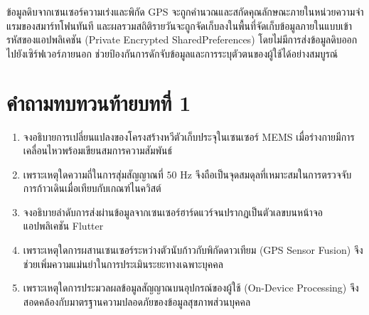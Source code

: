 ข้อมูลดิบจากเซนเซอร์ความเร่งและพิกัด GPS จะถูกคำนวณและสกัดคุณลักษณะภายในหน่วยความจำแรมของสมาร์ทโฟนทันที และผลรวมสถิติรายวันจะถูกจัดเก็บลงในพื้นที่จัดเก็บข้อมูลภายในแบบเข้ารหัสของแอปพลิเคชัน (Private Encrypted SharedPreferences) โดยไม่มีการส่งข้อมูลดิบออกไปยังเซิร์ฟเวอร์ภายนอก ช่วยป้องกันการดักจับข้อมูลและการระบุตัวตนของผู้ใช้ได้อย่างสมบูรณ์

\section*{คำถามทบทวนท้ายบทที่ 1}
\begin{enumerate}
    \item จงอธิบายการเปลี่ยนแปลงของโครงสร้างหวีตัวเก็บประจุในเซนเซอร์ MEMS เมื่อร่างกายมีการเคลื่อนไหวพร้อมเขียนสมการความสัมพันธ์
    \item เพราะเหตุใดความถี่ในการสุ่มสัญญาณที่ $50\text{ Hz}$ จึงถือเป็นจุดสมดุลที่เหมาะสมในการตรวจจับการก้าวเดินเมื่อเทียบกับเกณฑ์ไนควิสต์
    \item จงอธิบายลำดับการส่งผ่านข้อมูลจากเซนเซอร์ฮาร์ดแวร์จนปรากฏเป็นตัวเลขบนหน้าจอแอปพลิเคชัน Flutter
    \item เพราะเหตุใดการผสานเซนเซอร์ระหว่างตัวนับก้าวกับพิกัดดาวเทียม (GPS Sensor Fusion) จึงช่วยเพิ่มความแม่นยำในการประเมินระยะทางเฉพาะบุคคล
    \item เพราะเหตุใดการประมวลผลข้อมูลสัญญาณบนอุปกรณ์ของผู้ใช้ (On-Device Processing) จึงสอดคล้องกับมาตรฐานความปลอดภัยของข้อมูลสุขภาพส่วนบุคคล
\end{enumerate}
\clearpage
